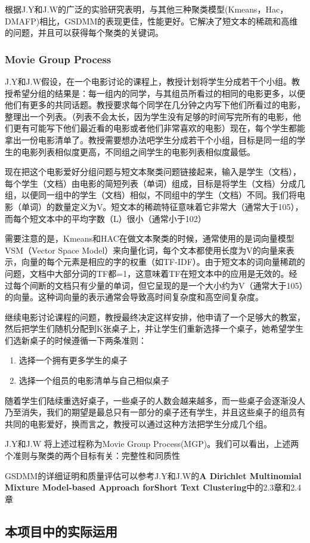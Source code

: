 根据J.Y和J.W的广泛的实验研究表明\cite{Yin:2014}，与其他三种聚类模型(Kmeans，Hac，DMAFP)相比，GSDMM的表现更佳，性能更好。它解决了短文本的稀疏和高维的问题，并且可以获得每个聚类的关键词。


\subsubsection{Movie Group Process}
J.Y和J.W假设，在一个电影讨论的课程上，教授计划将学生分成若干个小组。教授希望分组的结果是：每一组内的同学，与其组员所看过的相同的电影更多，以便他们有更多的共同话题。教授要求每个同学在几分钟之内写下他们所看过的电影，整理出一个列表。（列表不会太长，因为学生没有足够的时间写完所有的电影，他们更有可能写下他们最近看的电影或者他们非常喜欢的电影）现在，每个学生都能拿出一份电影清单了。教授需要想办法吧学生分成若干个小组，目标是同一组的学生的电影列表相似度更高，不同组之间学生的电影列表相似度最低。

现在把这个电影爱好分组问题与短文本聚类问题链接起来，输入是学生（文档），每个学生（文档）由电影的简短列表（单词）组成，目标是将学生（文档）分成几组，以便同一组中的学生（文档）相似，不同组中的学生（文档）不同。我们将电影（单词）的数量定义为V。短文本的稀疏特征意味着它非常大（通常大于105），而每个短文本中的平均字数（L）很小（通常小于102）

需要注意的是，Kmeans和HAC在做文本聚类的时候，通常使用的是词向量模型VSM（Vector Space Model）来向量化词，每个文本都使用长度为V的向量来表示，向量的每个元素是相应的字的权重（如TF-IDF）。由于短文本的词向量稀疏的问题，文档中大部分词的TF都=1，这意味着TF在短文本中的应用是无效的。经过每个间断的文档只有少量的单词，但它呈现的是一个大小约为V（通常大于105）的向量。这种词向量的表示通常会导致高时间复杂度和高空间复杂度。

继续电影讨论课程的问题，教授最终决定这样安排，他申请了一个足够大的教室，然后把学生们随机分配到K张桌子上，并让学生们重新选择一个桌子，她希望学生们选新桌子的时候遵循一下两条准则：

\begin{enumerate}
	\item 选择一个拥有更多学生的桌子
	\item 选择一个组员的电影清单与自己相似桌子
\end{enumerate}

随着学生们陆续重选好桌子，一些桌子的人数会越来越多，而一些桌子会逐渐没人乃至消失，我们的期望是最总只有一部分的桌子还有学生，并且这些桌子的组员有共同的电影爱好，换而言之，教授可以通过这种方法把学生分成几个组。

J.Y和J.W 将上述过程称为Movie Group Process(MGP)。我们可以看出，上述两个准则与聚类的两个目标有关：完整性和同质性\cite{DBLP:conf/emnlp/RosenbergH07}

GSDMM的详细证明和质量评估可以参考J.Y和J.W的\textbf{A Dirichlet Multinomial Mixture Model-based Approach forShort Text Clustering}\cite{Yin:2014}中的2.3章和2.4章

\subsection{本项目中的实际运用}

